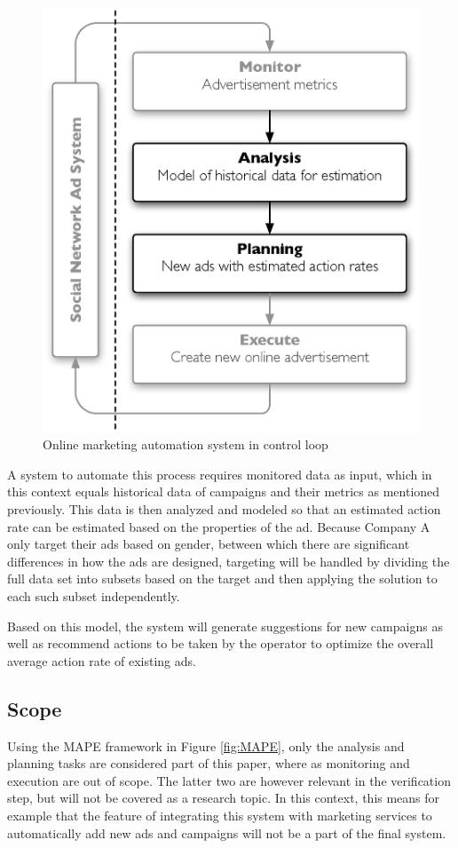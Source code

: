 \documentclass{sig-alternate}
\begin{document}
\begin{figure}[htb] \centering \includegraphics[width=\columnwidth]{mape-marketing.eps}
	\caption{Online marketing automation system in control loop}
	\label{fig:MAPEMarketing}
\end{figure}

A system to automate this process requires monitored data as input, which in this context equals historical data of campaigns and their metrics as mentioned previously. This data is then analyzed and modeled so that an estimated action rate can be estimated based on the properties of the ad. Because Company A only target their ads based on gender, between which there are significant differences in how the ads are designed, targeting will be handled by dividing the full data set into subsets based on the target and then applying the solution to each such subset independently.

Based on this model, the system will generate suggestions for new campaigns as well as recommend actions to be taken by the operator to optimize the overall average action rate of existing ads.

\subsection{Scope}
Using the MAPE framework in Figure \ref{fig:MAPE}, only the analysis and planning tasks are considered part of this paper, where as monitoring and execution are out of scope. The latter two are however relevant in the verification step, but will not be covered as a research topic. In this context, this means for example that the feature of integrating this system with marketing services to automatically add new ads and campaigns will not be a part of the final system.
\end{document}
